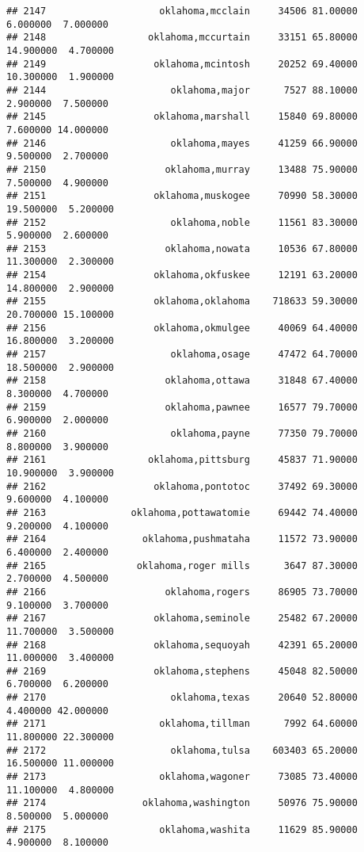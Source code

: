 \documentclass[
]{article}
\begin{document}
\begin{verbatim}
## 2147                    oklahoma,mcclain     34506 81.00000  6.000000  7.000000
## 2148                  oklahoma,mccurtain     33151 65.80000 14.900000  4.700000
## 2149                   oklahoma,mcintosh     20252 69.40000 10.300000  1.900000
## 2144                      oklahoma,major      7527 88.10000  2.900000  7.500000
## 2145                   oklahoma,marshall     15840 69.80000  7.600000 14.000000
## 2146                      oklahoma,mayes     41259 66.90000  9.500000  2.700000
## 2150                     oklahoma,murray     13488 75.90000  7.500000  4.900000
## 2151                   oklahoma,muskogee     70990 58.30000 19.500000  5.200000
## 2152                      oklahoma,noble     11561 83.30000  5.900000  2.600000
## 2153                     oklahoma,nowata     10536 67.80000 11.300000  2.300000
## 2154                   oklahoma,okfuskee     12191 63.20000 14.800000  2.900000
## 2155                   oklahoma,oklahoma    718633 59.30000 20.700000 15.100000
## 2156                   oklahoma,okmulgee     40069 64.40000 16.800000  3.200000
## 2157                      oklahoma,osage     47472 64.70000 18.500000  2.900000
## 2158                     oklahoma,ottawa     31848 67.40000  8.300000  4.700000
## 2159                     oklahoma,pawnee     16577 79.70000  6.900000  2.000000
## 2160                      oklahoma,payne     77350 79.70000  8.800000  3.900000
## 2161                  oklahoma,pittsburg     45837 71.90000 10.900000  3.900000
## 2162                   oklahoma,pontotoc     37492 69.30000  9.600000  4.100000
## 2163               oklahoma,pottawatomie     69442 74.40000  9.200000  4.100000
## 2164                 oklahoma,pushmataha     11572 73.90000  6.400000  2.400000
## 2165                oklahoma,roger mills      3647 87.30000  2.700000  4.500000
## 2166                     oklahoma,rogers     86905 73.70000  9.100000  3.700000
## 2167                   oklahoma,seminole     25482 67.20000 11.700000  3.500000
## 2168                   oklahoma,sequoyah     42391 65.20000 11.000000  3.400000
## 2169                   oklahoma,stephens     45048 82.50000  6.700000  6.200000
## 2170                      oklahoma,texas     20640 52.80000  4.400000 42.000000
## 2171                    oklahoma,tillman      7992 64.60000 11.800000 22.300000
## 2172                      oklahoma,tulsa    603403 65.20000 16.500000 11.000000
## 2173                    oklahoma,wagoner     73085 73.40000 11.100000  4.800000
## 2174                 oklahoma,washington     50976 75.90000  8.500000  5.000000
## 2175                    oklahoma,washita     11629 85.90000  4.900000  8.100000

\end{verbatim}
\end{document}
